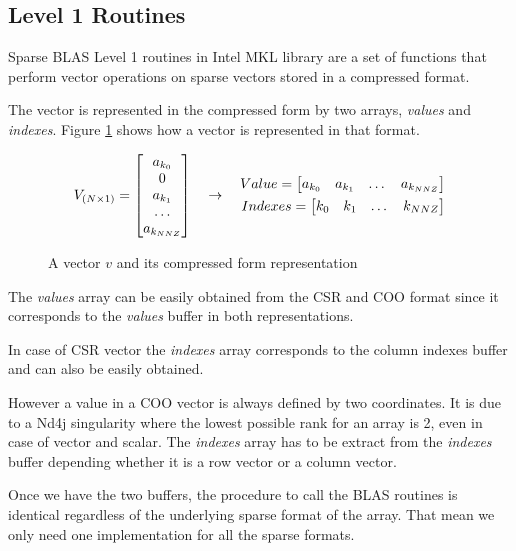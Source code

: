 \subsection{Level 1 Routines}

Sparse BLAS Level 1 routines in Intel MKL library \cite{mkllvl1} are a set of functions that perform vector operations on sparse vectors stored in a compressed format.	

The vector is represented in the compressed form by two arrays, \textit{values} and \textit{indexes}. Figure \ref{fig:compressedVector} shows how a vector is represented in that format.

\begin{figure}[h]
	\[
	\centering
	V_{(N\times 1)} = 
	\begin{bmatrix}
	a_{k_{0}}\\
	0\\
	a_{k_{1}}\\
	\dots\\
	a_{k_{NNZ}}
	\end{bmatrix}
	\quad\rightarrow\quad
	\begin{aligned}
		Value = 
		\begin{bmatrix}
		a_{k_{0}}& a_{{k_{1}}} & \dots & a_{k_{NNZ}}
		\end{bmatrix}\\
		Indexes = 
		\begin{bmatrix}
		k_{0} & k_{1} & \dots & k_{NNZ}		
		\end{bmatrix}
	\end{aligned}
	\]
	\caption{A vector $v$ and its compressed form representation}
	\label{fig:compressedVector}
\end{figure}

The \textit{values} array can be easily obtained from the CSR and COO format since it corresponds to the \textit{values} buffer in both representations.

In case of CSR vector the \textit{indexes} array corresponds to the column indexes buffer and can also be easily obtained.

However a value in a COO vector is always defined by two coordinates. It is due to a Nd4j singularity where the lowest possible rank for an array is 2, even in case of vector and scalar. The \textit{indexes} array has to be extract from the \textit{indexes} buffer depending whether it is a row vector or a column vector.

Once we have the two buffers, the procedure to call the BLAS routines is identical regardless of the underlying sparse format of the array. That mean we only need one implementation for all the sparse formats. 

